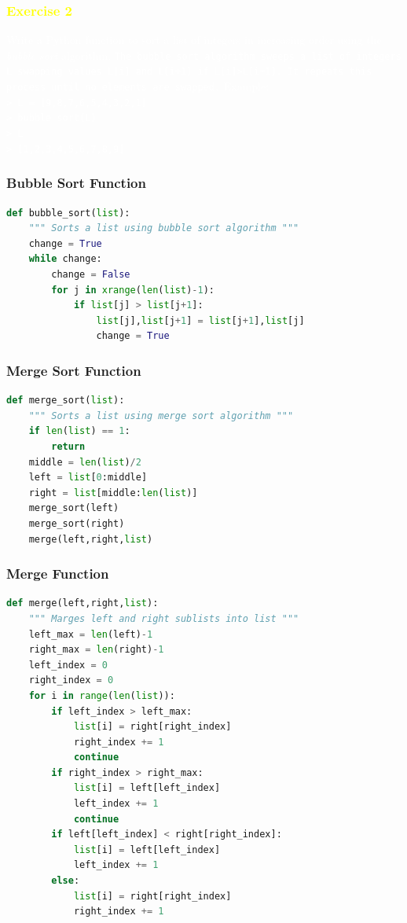 \documentclass[xcolor=table,10pt,final]{beamer}
\begin{document}
{
\begin{frame}
	\frametitle{\textcolor{yellow}{Exercise 2}}
	\textcolor{white}{Write a Python function to sort a list of integers in increasing order using the \emph{bubble sort} algorithm.\newline\newline
	{\tt The bubble sort algorithm sweeps a list of integers L swapping values L[i] and L[i+1] if L[i]>L[i+1]. It repeats this process until no elements are swapped.}\newline\newline
	Example: \\ {\tt > L = [9,8,7,6,5,4,3,2,1] }\\ {\tt > bubble\_sort(L)} \\ {\tt > L}\\ {\tt > [1,2,3,4,5,6,7,8,9]}
	}
\end{frame}
}

\begin{frame}[fragile]
	\frametitle{Bubble Sort Function}
	\begin{lstlisting}[language=Python]
def bubble_sort(list):
    """ Sorts a list using bubble sort algorithm """
    change = True
    while change:
        change = False
        for j in xrange(len(list)-1):
            if list[j] > list[j+1]:
                list[j],list[j+1] = list[j+1],list[j]
                change = True
	\end{lstlisting}
\end{frame}

\begin{frame}[fragile]
	\frametitle{Merge Sort Function}
	\begin{lstlisting}[language=Python]
def merge_sort(list):
    """ Sorts a list using merge sort algorithm """
    if len(list) == 1:
        return
    middle = len(list)/2
    left = list[0:middle]
    right = list[middle:len(list)]
    merge_sort(left)
    merge_sort(right)
    merge(left,right,list)
	\end{lstlisting}
\end{frame}

\begin{frame}[fragile]
	\frametitle{Merge Function}
	\begin{lstlisting}[language=Python]
def merge(left,right,list):
    """ Marges left and right sublists into list """
    left_max = len(left)-1
    right_max = len(right)-1
    left_index = 0
    right_index = 0
    for i in range(len(list)):
        if left_index > left_max:
            list[i] = right[right_index]
            right_index += 1
            continue
        if right_index > right_max:
            list[i] = left[left_index]
            left_index += 1
            continue
        if left[left_index] < right[right_index]:
            list[i] = left[left_index]
            left_index += 1
        else:
            list[i] = right[right_index]
            right_index += 1
	\end{lstlisting}
\end{frame}
\end{document}
